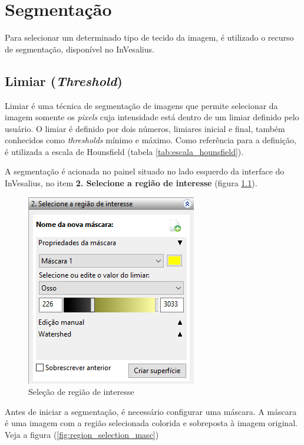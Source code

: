 \chapter{Segmentação}

Para selecionar um determinado tipo de tecido da imagem, é utilizado o recurso de 
segmentação, disponível no InVesalius.

\section{Limiar (\textit{Threshold})}

Limiar é uma técnica de segmentação de imagens que permite selecionar da imagem somente
os \textit{pixels} cuja intensidade está dentro de um limiar definido pelo usuário.
O limiar é definido por dois números, limiares inicial e final, também conhecidos como
\textit{thresholds} mínimo e máximo. Como referência para a definição, é utilizada a
escala de Hounsfield (tabela \ref{tab:escala_hounsfield}).

A segmentação é acionada no painel situado no lado esquerdo da interface do InVesalius,
no item \textbf{2. Selecione a região de interesse} (figura \ref{fig:region_selection}).

\begin{figure}[!htb]
\centering
\includegraphics[scale=0.6]{../user_guide_figures/invesalius_screen/segmentation_threshold_window_left_pt.png}
\caption{Seleção de região de interesse}
\label{fig:region_selection}
\end{figure}

Antes de iniciar a segmentação, é necessário configurar uma máscara. A máscara é uma
imagem com a região selecionada colorida e sobreposta à imagem original. Veja a figura
(\ref{fig:region_selection_masc})

